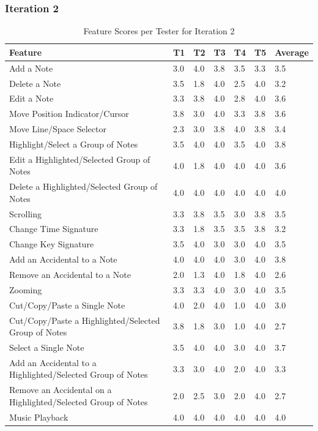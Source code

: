 			\subsubsection{Iteration 2}
				\begin{longtable}{|p{5cm}|R{.7cm}|R{.7cm}|R{.7cm}|R{.7cm}|R{.7cm}|R{1.5cm}|}
				  \caption{Feature Scores per Tester for Iteration 2} \label{tab:results-features-it2} \\ 
				  	\hline
				  	\textbf{Feature} & \textbf{T1} & \textbf{T2} & \textbf{T3} & \textbf{T4} & \textbf{T5} & \textbf{Average} \\ \hline
					Add a Note 																							& 3.0 & 4.0 & 3.8 & 3.5 & 3.3 & 3.5 \\ \hline
					Delete a Note 																						& 3.5 & 1.8 & 4.0 & 2.5 & 4.0 & 3.2 \\ \hline
					Edit a Note 																							& 3.3 & 3.8 & 4.0 & 2.8 & 4.0 & 3.6 \\ \hline
					Move Position Indicator/Cursor 															& 3.8 & 3.0 & 4.0 & 3.3 & 3.8 & 3.6 \\ \hline
					Move Line/Space Selector 																	& 2.3 & 3.0 & 3.8 & 4.0 & 3.8 & 3.4 \\ \hline
					Highlight/Select a Group of Notes 														& 3.5 & 4.0 & 4.0 & 3.5 & 4.0 & 3.8 \\ \hline
					Edit a Highlighted/Selected Group of Notes 										& 4.0 & 1.8 & 4.0 & 4.0 & 4.0 & 3.6 \\ \hline
					Delete a Highlighted/Selected Group of Notes 									& 4.0 & 4.0 & 4.0 & 4.0 & 4.0 & 4.0 \\ \hline
					Scrolling																								& 3.3 & 3.8 & 3.5 & 3.0 & 3.8 & 3.5 \\ \hline
					Change Time Signature 																		& 3.3 & 1.8 & 3.5 & 3.5 & 3.8 & 3.2 \\ \hline
					Change Key Signature 																		& 3.5 & 4.0 & 3.0 & 3.0 & 4.0 & 3.5 \\ \hline
					Add an Accidental to a Note 																& 4.0 & 4.0 & 4.0 & 3.0 & 4.0 & 3.8 \\ \hline
					Remove an Accidental to a Note 														& 2.0 & 1.3 & 4.0 & 1.8 & 4.0 & 2.6 \\ \hline
					Zooming 																								& 3.3 & 3.3 & 4.0 & 3.0 & 4.0 & 3.5 \\ \hline
					Cut/Copy/Paste a Single Note 															& 4.0 & 2.0 & 4.0 & 1.0 & 4.0 & 3.0 \\ \hline
					Cut/Copy/Paste a Highlighted/Selected Group of Notes 					& 3.8 & 1.8 & 3.0 & 1.0 & 4.0 & 2.7 \\ \hline
					Select a Single Note 																			& 3.5 & 4.0 & 4.0 & 3.0 & 4.0 & 3.7 \\ \hline
					Add an Accidental to a Highlighted/Selected Group of Notes 			& 3.3 & 3.0 & 4.0 & 2.0 & 4.0 & 3.3 \\ \hline
					Remove an Accidental on a Highlighted/Selected Group of Notes 	& 2.0 & 2.5 & 3.0 & 2.0 & 4.0 & 2.7 \\ \hline
					Music Playback 																					& 4.0 & 4.0 & 4.0 & 4.0 & 4.0 & 4.0 \\ \hline


\end{longtable}

